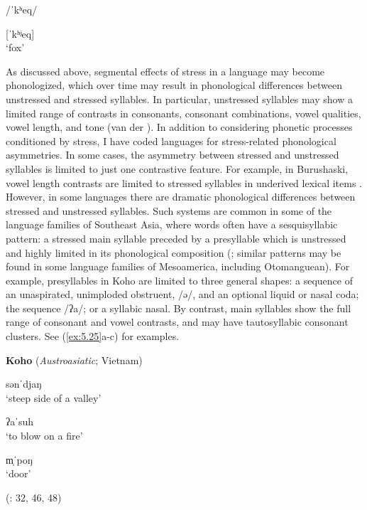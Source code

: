 /ˈkʰeq/

[ˈkʰʲeq]\\
\glt ‘fox’
\citep[23]{Shiraishi2006}
\z

  As discussed above, segmental effects of stress in a language may become phonologized, which over time may result in phonological differences between unstressed and stressed syllables. In particular, unstressed syllables may show a limited range of contrasts in consonants, consonant combinations, vowel qualities, vowel length, and tone (van der \citealt{Hulst2010}). In addition to considering phonetic processes conditioned by stress, I have coded languages for stress-related phonological asymmetries. In some cases, the asymmetry between stressed and unstressed syllables is limited to just one contrastive feature. For example, in Burushaski, vowel length contrasts are limited to stressed syllables in underived lexical items \citep[1028]{Anderson1997}. However, in some languages there are dramatic phonological differences between stressed and unstressed syllables. Such systems are common in some of the language families of Southeast Asia, where words often have a sesquisyllabic pattern: a stressed main syllable preceded by a presyllable which is unstressed and highly limited in its phonological composition (\citealt{Matisoff1973,Michaud2012}; similar patterns may be found in some language families of Mesoamerica, including Otomanguean). For example, presyllables in Koho are limited to three general shapes: a sequence of an unaspirated, unimploded obstruent, /ə/, and an optional liquid or nasal coda; the sequence /ʔa/; or a syllabic nasal. By contrast, main syllables show the full range of consonant and vowel contrasts, and may have tautosyllabic consonant clusters. See (\ref{ex:5.25}a-c) for examples.

\ea\label{ex:5.25}
  \textbf{Koho} (\textit{Austroasiatic}; Vietnam)

\ea  sənˈdjaŋ\\
\glt ‘steep side of a valley’

\ex  ʔaˈsuh\\
\glt ‘to blow on a fire’

\ex  m̩ˈpoŋ\\
\glt ‘door’

(\citealt{Olsen2014}: 32, 46, 48)
\z
\z

